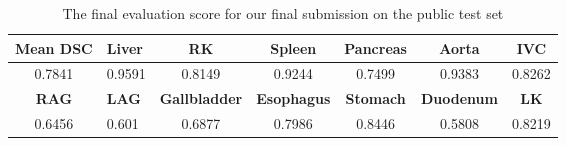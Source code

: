 \begin{table}[h]
\centering
\caption{The final evaluation score for our final submission on the public test set}
\footnotesize
\begin{tabular}{| c | l | c | c | c | c | c |}
\hline
\textbf{Mean DSC} & \textbf{Liver} & \textbf{RK} & \textbf{Spleen} &	\textbf{Pancreas} &	\textbf{Aorta} &	\textbf{IVC} \\
\hline
0.7841 &	0.9591 &	0.8149 &	0.9244 &	0.7499 &	0.9383 &	0.8262 \\
\hline
\hline
\textbf{RAG} &	\textbf{LAG} &	\textbf{Gallbladder} &	\textbf{Esophagus} &	\textbf{Stomach} &	\textbf{Duodenum} &	\textbf{LK} \\
\hline
0.6456 &	0.601 &	0.6877 &	0.7986 &	0.8446 &	0.5808 &	0.8219   \\

\hline
\end{tabular}
\label{table:submission}
\vspace{-2mm}
\end{table}

